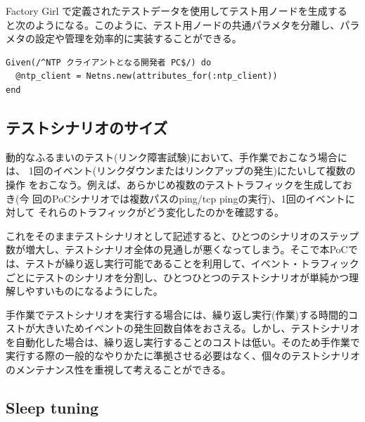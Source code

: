 Factory Girl で定義されたテストデータを使用してテスト用ノードを生成する
と次のようになる。このように、テスト用ノードの共通パラメタを分離し、パラ
メタの設定や管理を効率的に実装することができる。
\begin{lstlisting}
Given(/^NTP クライアントとなる開発者 PC$/) do
  @ntp_client = Netns.new(attributes_for(:ntp_client))
end
\end{lstlisting}

  \subsection{テストシナリオのサイズ}


動的なふるまいのテスト(リンク障害試験)において、手作業でおこなう場合には、
1回のイベント(リンクダウンまたはリンクアップの発生)にたいして複数の操作
をおこなう。例えば、あらかじめ複数のテストトラフィックを生成しておき(今
回のPoCシナリオでは複数パスのping/tcp pingの実行)、1回のイベントに対して
それらのトラフィックがどう変化したのかを確認する。

これをそのままテストシナリオとして記述すると、ひとつのシナリオのステップ
数が増大し、テストシナリオ全体の見通しが悪くなってしまう。そこで本PoCで
は、テストが繰り返し実行可能であることを利用して、イベント・トラフィック
ごとにテストのシナリオを分割し、ひとつひとつのテストシナリオが単純かつ理
解しやすいものになるようにした。

手作業でテストシナリオを実行する場合には、繰り返し実行(作業)する時間的コ
ストが大きいためイベントの発生回数自体をおさえる。しかし、テストシナリオ
を自動化した場合は、繰り返し実行することのコストは低い。そのため手作業で
実行する際の一般的なやりかたに準拠させる必要はなく、個々のテストシナリオ
のメンテナンス性を重視して考えることができる。

  \subsection{Sleep tuning}

